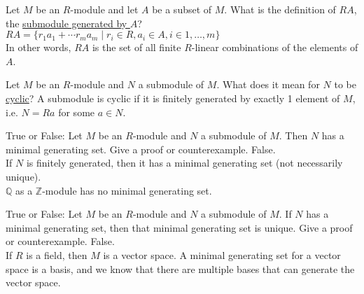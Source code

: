 \documentclass[avery5371,grid]{flashcards}
\newcommand{\Z}{\mathbb{Z}}
\newcommand{\Q}{\mathbb{Q}}
\begin{document}
\begin{flashcard}[Modules]{Let $M$ be an $R$-module and let $A$ be a subset of $M$. What is the definition of $RA$, the \underline{submodule generated by $A$}?}
 $RA = \{r_1a_1 + \cdots r_ma_m \mid r_i \in R, a_i \in A, i \in {1, \ldots, m}\}$\\
 
 In other words, $RA$ is the set of all finite $R$-linear combinations of the elements of $A$.
\end{flashcard}


\begin{flashcard}[Modules]{Let $M$ be an $R$-module and $N$ a submodule of $M$. What does it mean for $N$ to be \underline{cyclic}?}
 A submodule is cyclic if it is finitely generated by exactly 1 element of $M$, i.e. $N = Ra$ for some $a \in N$.
\end{flashcard}


\begin{flashcard}[Modules]{True or False: Let $M$ be an $R$-module and $N$ a submodule of $M$. Then $N$ has a minimal generating set. Give a proof or counterexample.}
 False.\\
 
 If $N$ is finitely generated, then it has a minimal generating set (not necessarily unique).\\
 
 $\Q$ as a $\Z$-module has no minimal generating set.
\end{flashcard}


\begin{flashcard}[Modules]{True or False: Let $M$ be an $R$-module and $N$ a submodule of $M$. If $N$ has a minimal generating set, then that minimal generating set is unique. Give a proof or counterexample.}
 False.\\
 
 If $R$ is a field, then $M$ is a vector space. A minimal generating set for a vector space is a basis, and we know that there are multiple bases that can generate the vector space.
\end{flashcard}
\end{document}
